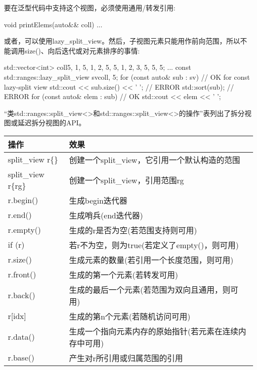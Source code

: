 要在泛型代码中支持这个视图，必须使用通用/转发引用:

\begin{cpp}
void printElems(auto&& coll) {
	...
}
\end{cpp}

或者，可以使用lazy\_split\_view。然后，子视图元素只能用作前向范围，所以不能调用size()、向后迭代或对元素排序的事情:

\begin{cpp}
std::vector<int> coll{5, 1, 5, 1, 2, 5, 5, 1, 2, 3, 5, 5, 5};
...
const std::ranges::lazy_split_view sv{coll, 5};
for (const auto& sub : sv) { // OK for const lazy-split view
	std::cout << sub.size() << ' '; // ERROR
	std::sort(sub); // ERROR
	for (const auto& elem : sub) { // OK
		std::cout << elem << ' ';
	}
}
\end{cpp}


“类std::ranges::split\_view<>和std::ranges::split\_view<>的操作”表列出了拆分视图或延迟拆分视图的API。

\begin{longtable}[c]{|l|l|}
\hline
\textbf{操作}  & \textbf{效果}                                                 \\ \hline
\endfirsthead
%
\endhead
%
split\_view r\{\} & 创建一个split\_view，它引用一个默认构造的范围                                   \\ \hline
split\_view r\{rg\} & 创建一个split\_view，引用范围rg                   \\ \hline
r.begin()           & 生成begin迭代器                                       \\ \hline
r.end()             & 生成哨兵(end迭代器)                              \\ \hline
r.empty()           & 生成的r是否为空(若范围支持则可用) \\ \hline
if (r)              & 若r不为空，则为true(若定义了empty()，则可用)         \\ \hline
r.size()          & 生成元素的数量(若引用一个长度范围，则可用)                              \\ \hline
r.front()           & 生成的第一个元素(若转发可用)               \\ \hline
r.back()            & 生成的最后一个元素(若范围为双向且通用，则可用)  \\ \hline
r{[}idx{]}          & 生成的第n个元素(若随机访问可用)            \\ \hline
r.data()          & 生成一个指向元素内存的原始指针(若元素在连续内存中可用) \\ \hline
r.base()            & 产生对r所引用或归属范围的引用        \\ \hline
\end{longtable}

